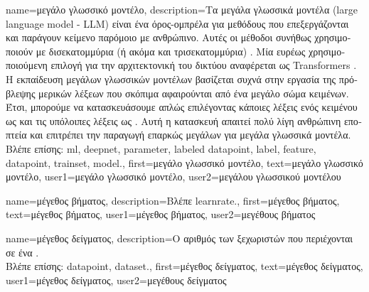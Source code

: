 {name={\foreignlanguage{greek}{μεγάλο γλωσσικό μοντέλο}},
	description={\foreignlanguage{greek}{Τα μεγάλα γλωσσικά μοντέλα} 
		(large language model - LLM) \foreignlanguage{greek}{είναι ένα όρος-ομπρέλα για μεθόδους}  \foreignlanguage{greek}{που 
		επεξεργάζονται και παράγουν κείμενο παρόμοιο με ανθρώπινο. Αυτές οι μέθοδοι συνήθως χρησιμοποιούν} 
		 \foreignlanguage{greek}{με δισεκατομμύρια (ή ακόμα και τρισεκατομμύρια)} . 
		\foreignlanguage{greek}{Μία ευρέως χρησιμοποιούμενη επιλογή για την αρχιτεκτονική του δικτύου αναφέρεται ως} Transformers 
		\cite{vaswani2017attention}. \foreignlanguage{greek}{Η εκπαίδευση μεγάλων γλωσσικών μοντέλων βασίζεται συχνά στην εργασία της πρόβλεψης 
		μερικών λέξεων που σκόπιμα αφαιρούνται από ένα μεγάλο σώμα κειμένων. Έτσι, μπορούμε να κατασκευάσουμε}  
		\foreignlanguage{greek}{απλώς επιλέγοντας κάποιες λέξεις ενός κειμένου ως}  \foreignlanguage{greek}{και τις υπόλοιπες 
		λέξεις ως}  . \foreignlanguage{greek}{Αυτή η κατασκευή απαιτεί πολύ λίγη ανθρώπινη εποπτεία 
		και επιτρέπει την παραγωγή επαρκώς μεγάλων}  \foreignlanguage{greek}{για μεγάλα γλωσσικά μοντέλα.} \\
		\foreignlanguage{greek}{Βλέπε επίσης:} \gls{ml}, \gls{deepnet}, \gls{parameter}, \gls{labeled datapoint}, \gls{label}, \gls{feature}, 
		\gls{datapoint}, \gls{trainset}, \gls{model}.},
	first={\foreignlanguage{greek}{μεγάλο γλωσσικό μοντέλο}},
	text={\foreignlanguage{greek}{μεγάλο γλωσσικό μοντέλο}},
	user1={\foreignlanguage{greek}{μεγάλο γλωσσικό μοντέλο}}, %
	user2={\foreignlanguage{greek}{μεγάλου γλωσσικού μοντέλου}} %
}

{name={\foreignlanguage{greek}{μέγεθος βήματος}}, 
	description={\foreignlanguage{greek}{Βλέπε} \gls{learnrate}.}, 
	first={\foreignlanguage{greek}{μέγεθος βήματος}},
	text={\foreignlanguage{greek}{μέγεθος βήματος}},
	user1={\foreignlanguage{greek}{μέγεθος βήματος}}, %
  	user2={\foreignlanguage{greek}{μεγέθους βήματος}} %
}

{name={\foreignlanguage{greek}{μέγεθος δείγματος}},
	description={\foreignlanguage{greek}{Ο} 
		\foreignlanguage{greek}{αριθμός των ξεχωριστών}  \foreignlanguage{greek}{που περιέχονται 
		σε ένα} .\\
		\foreignlanguage{greek}{Βλέπε επίσης:} \gls{datapoint}, \gls{dataset}.},
	first={\foreignlanguage{greek}{μέγεθος δείγματος}},
	text={\foreignlanguage{greek}{μέγεθος δείγματος}},
	user1={\foreignlanguage{greek}{μέγεθος δείγματος}}, %
	user2={\foreignlanguage{greek}{μεγέθους δείγματος}} %
}

